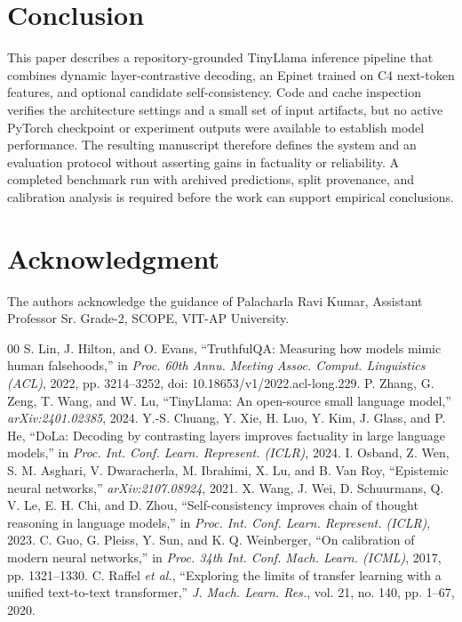 \documentclass[conference]{IEEEtran}
\begin{document}
\section{Conclusion}
This paper describes a repository-grounded TinyLlama inference pipeline that combines dynamic layer-contrastive decoding, an Epinet trained on C4 next-token features, and optional candidate self-consistency. Code and cache inspection verifies the architecture settings and a small set of input artifacts, but no active PyTorch checkpoint or experiment outputs were available to establish model performance. The resulting manuscript therefore defines the system and an evaluation protocol without asserting gains in factuality or reliability. A completed benchmark run with archived predictions, split provenance, and calibration analysis is required before the work can support empirical conclusions.

\section*{Acknowledgment}
The authors acknowledge the guidance of Palacharla Ravi Kumar, Assistant Professor Sr. Grade-2, SCOPE, VIT-AP University.

\begin{thebibliography}{00}
 S. Lin, J. Hilton, and O. Evans, ``TruthfulQA: Measuring how models mimic human falsehoods,'' in \emph{Proc. 60th Annu. Meeting Assoc. Comput. Linguistics (ACL)}, 2022, pp. 3214--3252, doi: 10.18653/v1/2022.acl-long.229.
 P. Zhang, G. Zeng, T. Wang, and W. Lu, ``TinyLlama: An open-source small language model,'' \emph{arXiv:2401.02385}, 2024.
 Y.-S. Chuang, Y. Xie, H. Luo, Y. Kim, J. Glass, and P. He, ``DoLa: Decoding by contrasting layers improves factuality in large language models,'' in \emph{Proc. Int. Conf. Learn. Represent. (ICLR)}, 2024.
 I. Osband, Z. Wen, S. M. Asghari, V. Dwaracherla, M. Ibrahimi, X. Lu, and B. Van Roy, ``Epistemic neural networks,'' \emph{arXiv:2107.08924}, 2021.
 X. Wang, J. Wei, D. Schuurmans, Q. V. Le, E. H. Chi, and D. Zhou, ``Self-consistency improves chain of thought reasoning in language models,'' in \emph{Proc. Int. Conf. Learn. Represent. (ICLR)}, 2023.
 C. Guo, G. Pleiss, Y. Sun, and K. Q. Weinberger, ``On calibration of modern neural networks,'' in \emph{Proc. 34th Int. Conf. Mach. Learn. (ICML)}, 2017, pp. 1321--1330.
 C. Raffel \emph{et al.}, ``Exploring the limits of transfer learning with a unified text-to-text transformer,'' \emph{J. Mach. Learn. Res.}, vol. 21, no. 140, pp. 1--67, 2020.
\end{thebibliography}
\end{document}
